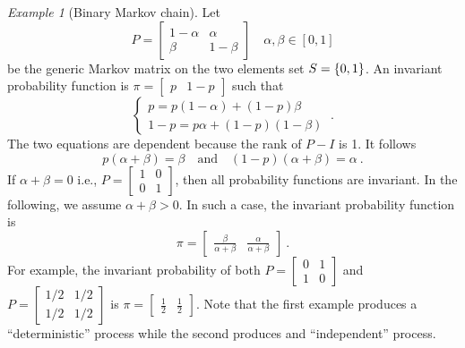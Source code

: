 \documentclass[12pt,a4paper]{amsart}
\theoremstyle{plain}%
\theoremstyle{definition}
\theoremstyle{remark}
\newtheorem{example}{Example}
\begin{document}
\begin{example}[Binary Markov chain]
Let
\begin{equation*}
  P = \begin{bmatrix} 1-\alpha & \alpha \\ \beta & 1-\beta
  \end{bmatrix}  \quad \alpha,\beta \in [0,1]
\end{equation*}
be the generic Markov matrix on the two elements set $S=\left\{0,1\right\}$. An invariant probability function is $\pi =
\begin{bmatrix}
  p & 1-p
\end{bmatrix}$
such that
\begin{equation*}
  \begin{cases}
    p = p(1-\alpha) + (1-p)\beta \\ 1-p = p\alpha + (1-p)(1-\beta)
  \end{cases} \ .
\end{equation*}
The two equations are dependent because the rank of $P-I$ is 1. It follows
\begin{equation*}
  p(\alpha+\beta) = \beta \quad \text{and} \quad (1-p)(\alpha+\beta) = \alpha \ .
\end{equation*}
If $\alpha+\beta=0$ i.e., $P=
\begin{bmatrix}
  1 & 0 \\ 0 & 1
\end{bmatrix}$, then all probability functions are invariant. In the following, we assume $\alpha+\beta > 0$. In such a case, the invariant probability function is
\begin{equation*}
  \pi =
  \begin{bmatrix}
    \frac \beta {\alpha+\beta} & \frac \alpha {\alpha+\beta}
  \end{bmatrix} \ .
\end{equation*}
For example, the invariant probability of both $P =
\begin{bmatrix}
  0 & 1 \\ 1 & 0
\end{bmatrix}$ and $P =
\begin{bmatrix}
  1/2 & 1/2 \\ 1/2 & 1/2
\end{bmatrix}$
is $\pi =
\begin{bmatrix}
  \frac12 & \frac12
\end{bmatrix}$.
Note that the first example produces a ``deterministic'' process while the second produces and ``independent'' process.


\end{example}
\end{document}
